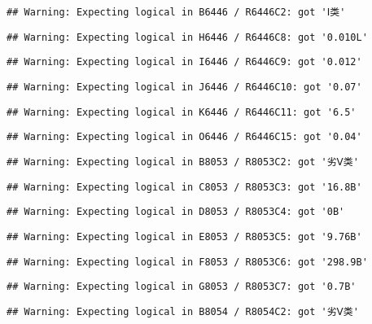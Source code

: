 \documentclass[
]{article}
\begin{document}
\begin{verbatim}
## Warning: Expecting logical in B6446 / R6446C2: got 'Ⅰ类'
\end{verbatim}

\begin{verbatim}
## Warning: Expecting logical in H6446 / R6446C8: got '0.010L'
\end{verbatim}

\begin{verbatim}
## Warning: Expecting logical in I6446 / R6446C9: got '0.012'
\end{verbatim}

\begin{verbatim}
## Warning: Expecting logical in J6446 / R6446C10: got '0.07'
\end{verbatim}

\begin{verbatim}
## Warning: Expecting logical in K6446 / R6446C11: got '6.5'
\end{verbatim}

\begin{verbatim}
## Warning: Expecting logical in O6446 / R6446C15: got '0.04'
\end{verbatim}

\begin{verbatim}
## Warning: Expecting logical in B8053 / R8053C2: got '劣Ⅴ类'
\end{verbatim}

\begin{verbatim}
## Warning: Expecting logical in C8053 / R8053C3: got '16.8B'
\end{verbatim}

\begin{verbatim}
## Warning: Expecting logical in D8053 / R8053C4: got '0B'
\end{verbatim}

\begin{verbatim}
## Warning: Expecting logical in E8053 / R8053C5: got '9.76B'
\end{verbatim}

\begin{verbatim}
## Warning: Expecting logical in F8053 / R8053C6: got '298.9B'
\end{verbatim}

\begin{verbatim}
## Warning: Expecting logical in G8053 / R8053C7: got '0.7B'
\end{verbatim}

\begin{verbatim}
## Warning: Expecting logical in B8054 / R8054C2: got '劣Ⅴ类'
\end{verbatim}
\end{document}
